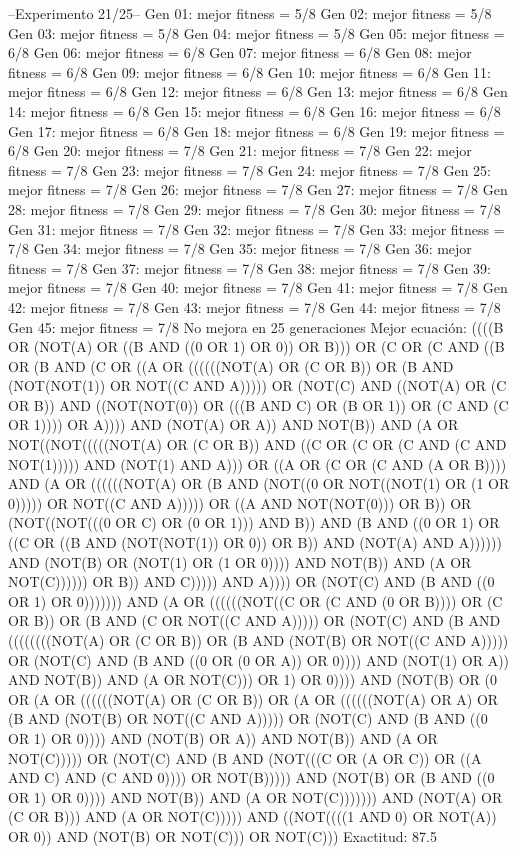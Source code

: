 --Experimento 
 21/25--
Gen 01: mejor fitness = 5/8
Gen 02: mejor fitness = 5/8
Gen 03: mejor fitness = 5/8
Gen 04: mejor fitness = 5/8
Gen 05: mejor fitness = 6/8
Gen 06: mejor fitness = 6/8
Gen 07: mejor fitness = 6/8
Gen 08: mejor fitness = 6/8
Gen 09: mejor fitness = 6/8
Gen 10: mejor fitness = 6/8
Gen 11: mejor fitness = 6/8
Gen 12: mejor fitness = 6/8
Gen 13: mejor fitness = 6/8
Gen 14: mejor fitness = 6/8
Gen 15: mejor fitness = 6/8
Gen 16: mejor fitness = 6/8
Gen 17: mejor fitness = 6/8
Gen 18: mejor fitness = 6/8
Gen 19: mejor fitness = 6/8
Gen 20: mejor fitness = 7/8
Gen 21: mejor fitness = 7/8
Gen 22: mejor fitness = 7/8
Gen 23: mejor fitness = 7/8
Gen 24: mejor fitness = 7/8
Gen 25: mejor fitness = 7/8
Gen 26: mejor fitness = 7/8
Gen 27: mejor fitness = 7/8
Gen 28: mejor fitness = 7/8
Gen 29: mejor fitness = 7/8
Gen 30: mejor fitness = 7/8
Gen 31: mejor fitness = 7/8
Gen 32: mejor fitness = 7/8
Gen 33: mejor fitness = 7/8
Gen 34: mejor fitness = 7/8
Gen 35: mejor fitness = 7/8
Gen 36: mejor fitness = 7/8
Gen 37: mejor fitness = 7/8
Gen 38: mejor fitness = 7/8
Gen 39: mejor fitness = 7/8
Gen 40: mejor fitness = 7/8
Gen 41: mejor fitness = 7/8
Gen 42: mejor fitness = 7/8
Gen 43: mejor fitness = 7/8
Gen 44: mejor fitness = 7/8
Gen 45: mejor fitness = 7/8
No mejora en 25 generaciones
Mejor ecuación: ((((B OR (NOT(A) OR ((B AND ((0 OR 1) OR 0)) OR B))) OR (C OR (C AND ((B OR (B AND (C OR ((A OR ((((((NOT(A) OR (C OR B)) OR (B AND (NOT(NOT(1)) OR NOT((C AND A))))) OR (NOT(C) AND ((NOT(A) OR (C OR B)) AND ((NOT(NOT(0)) OR (((B AND C) OR (B OR 1)) OR (C AND (C OR 1)))) OR A)))) AND (NOT(A) OR A)) AND NOT(B)) AND (A OR NOT((NOT(((((NOT(A) OR (C OR B)) AND ((C OR (C OR (C AND (C AND NOT(1))))) AND (NOT(1) AND A))) OR ((A OR (C OR (C AND (A OR B)))) AND (A OR ((((((NOT(A) OR (B AND (NOT((0 OR NOT((NOT(1) OR (1 OR 0))))) OR NOT((C AND A))))) OR ((A AND NOT(NOT(0))) OR B)) OR (NOT((NOT(((0 OR C) OR (0 OR 1))) AND B)) AND (B AND ((0 OR 1) OR ((C OR ((B AND (NOT(NOT(1)) OR 0)) OR B)) AND (NOT(A) AND A)))))) AND (NOT(B) OR (NOT(1) OR (1 OR 0)))) AND NOT(B)) AND (A OR NOT(C)))))) OR B)) AND C))))) AND A)))) OR (NOT(C) AND (B AND ((0 OR 1) OR 0))))))) AND (A OR ((((((NOT((C OR (C AND (0 OR B)))) OR (C OR B)) OR (B AND (C OR NOT((C AND A))))) OR (NOT(C) AND (B AND ((((((((NOT(A) OR (C OR B)) OR (B AND (NOT(B) OR NOT((C AND A))))) OR (NOT(C) AND (B AND ((0 OR (0 OR A)) OR 0)))) AND (NOT(1) OR A)) AND NOT(B)) AND (A OR NOT(C))) OR 1) OR 0)))) AND (NOT(B) OR (0 OR (A OR ((((((NOT(A) OR (C OR B)) OR (A OR ((((((NOT(A) OR A) OR (B AND (NOT(B) OR NOT((C AND A))))) OR (NOT(C) AND (B AND ((0 OR 1) OR 0)))) AND (NOT(B) OR A)) AND NOT(B)) AND (A OR NOT(C))))) OR (NOT(C) AND (B AND (NOT(((C OR (A OR C)) OR ((A AND C) AND (C AND 0)))) OR NOT(B))))) AND (NOT(B) OR (B AND ((0 OR 1) OR 0)))) AND NOT(B)) AND (A OR NOT(C))))))) AND (NOT(A) OR (C OR B))) AND (A OR NOT(C))))) AND ((NOT((((1 AND 0) OR NOT(A)) OR 0)) AND (NOT(B) OR NOT(C))) OR NOT(C)))
 Exactitud: 87.5%

